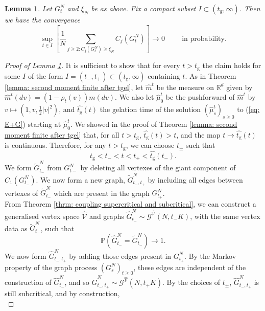 \documentclass[11pt, notitlepage]{article}
\newtheorem{lem}[thm]{Lemma}
\begin{document}
\begin{lem}\label{lemma: anomalous clusters 2}
       Let $G^N_t$ and $\xi_N$ be as above. Fix a compact subset $I\subset (t_\mathrm{g}, \infty)$. Then we have the convergence \begin{equation} \sup_{t \in I}\left[\frac{1}{N}\sum_{j\geq 2: C_j(G^N_t)\geq \xi_N} C_j(G^N_t)\right] \rightarrow 0 \hspace{1cm}\text{in probability.}\end{equation}
\end{lem}
\begin{proof}[Proof of Lemma \ref{lemma: anomalous clusters 2}]  It is sufficient to show that for every $t>t_\mathrm{g}$ the claim holds for some $I$ of the form $I=(t_-, t_+) \subset (t_\mathrm{g}, \infty)$ containing $t$.
As in Theorem \ref{lemma: second moment finite after tgel}, let $\widehat{m}^t$ be the measure on $\mathbb{R}^d$ given by $\widehat{m}^t(dv)=(1-\rho_t(v))m(dv)$. We also let $\widehat{\mu}^t_0$ be the pushforward of $\widehat{m}^t$ by $v\mapsto (1,v,\frac{1}{2}|v|^2)$, and $\widehat{t_\mathrm{g}}(t)$ the gelation time of the solution $(\widehat{\mu}^t_s)_{s\ge 0}$ to (\ref{eq: E+G}) starting at $\widehat{\mu}^t_0$. We showed in the proof of Theorem \ref{lemma: second moment finite after tgel} that, for all $t>t_\mathrm{g}$,  $\widehat{t_\mathrm{g}}(t)>t$, and the map $t\mapsto \widehat{t_\mathrm{g}}(t)$ is continuous. Therefore, for any $t>t_\mathrm{g}$, we can choose $t_\pm$ such that
\begin{equation}
    t_\mathrm{g}<t_-<t<t_+<\widehat{t_\mathrm{g}}(t_-).
\end{equation} We form $\widetilde{G}^N_{t_-}$ from $G^N_{t-}$ by deleting all vertexes of the giant component of $C_1(G^N_{t_-})$. We now form a new graph, $\widetilde{G}^N_{t_-,t_+}$ by including all edges between vertexes of $\widetilde{G}^N_{t_-}$ which are present in the graph $G^N_{t_+}$. \medskip \\ From Theorem \ref{thrm: coupling supercritical and subcritical}, we can construct a generalised vertex space $\widehat{\mathcal{V}}$ and graphs $\widehat{G}^N_{t_-}\sim \mathcal{G}^{\widehat{\mathcal{V}}}(N,t_-K)$, with the same vertex data as $\widetilde{G}^N_{t_-}$, such that \begin{equation}
    \mathbb{P}\left(\widehat{G}^N_{t_-}=\widetilde{G}^N_{t_-}\right)\rightarrow 1.
\end{equation} We now form $\widehat{G}^N_{t_-,t_+}$ by adding those edges present in $G^N_{t_+}$. By the Markov property of the graph process $(G^N_s)_{t\geq 0}$, these edges are independent of the construction of $\widehat{G}^N_{t_-}$, and so $\widehat{G}^N_{t_-,t_+}\sim \mathcal{G}^{\widehat{\mathcal{V}}}(N,t_+K)$. By the choices of $t_\pm$, $\widehat{G}^N_{t_-,t_+}$ is still subcritical, and by construction, \begin{equation}

\end{equation}
\end{proof}
\end{document}
